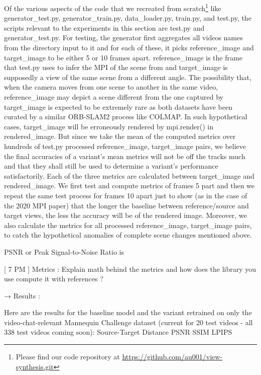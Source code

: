 Of the various aspects of the code that we recreated from scratch\footnote{Please find our code repository at \url{https://github.com/au001/view-synthesis.git}} like generator\_test.py, generator\_train.py, data\_loader.py, train.py, and test.py, the scripts relevant to the experiments in this section are test.py and generator\_test.py. For testing, the generator first aggregates all videos names from the directory input to it and for each of these, it picks reference\_image and target\_image to be either 5 or 10 frames apart. reference\_image is the frame that test.py uses to infer the MPI of the scene from and target\_image is supposedly a view of the same scene from a different angle. The possibility that, when the camera moves from one scene to another in the same video, reference\_image may depict a scene different from the one captured by target\_image is expected to be extremely rare as both datasets have been curated by a similar ORB-SLAM2 process like COLMAP. In such hypothetical cases, target\_image will be erroneously rendered by mpi.render() in rendered\_image. But since we take the mean of the computed metrics over hundreds of test.py processed reference\_image, target\_image pairs, we believe the final accuracies of a variant's mean metrics will not be off the tracks much and that they shall still be used to determine a variant’s performance satisfactorily. Each of the three metrics are calculated between target\_image and rendered\_image. We first test and compute metrics of frames 5 part and then we repeat the same test process for frames 10 apart just to show (as in the case of the 2020 MPI paper) that the longer the baseline between reference/source and target views, the less the accuracy will be of the rendered image. Moreover, we also calculate the metrics for all processed reference\_image, target\_image pairs, to catch the hypothetical anomalies of complete scene changes mentioned above.  

PSNR or Peak Signal-to-Noise Ratio is 

[ 7 PM ]
Metrics : Explain math behind the metrics and how does the library you use compute it with references ? 


→ Results : 

Here are the results for the baseline model and the variant retrained on only the video-chat-relevant Mannequin Challenge dataset (current for 20 test videos - all 338 test videos coming soon):
Source-Target Distance PSNR SSIM LPIPS



























